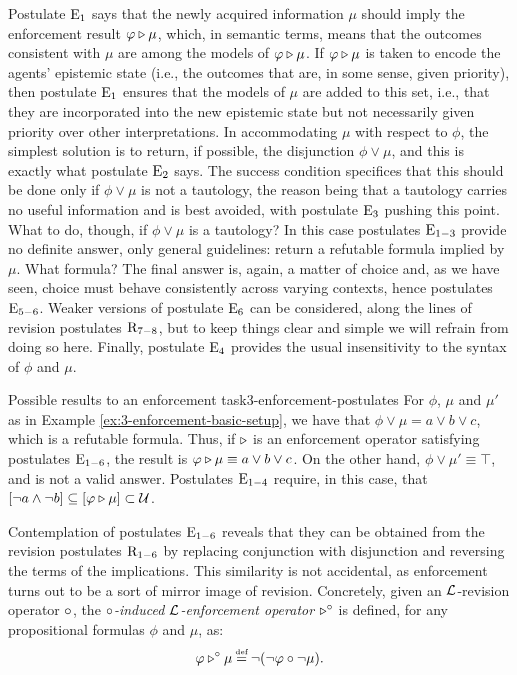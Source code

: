 Postulate $\mathrm{E}_{1}$ says that the newly acquired information $\mu$ 
should imply the enforcement result $\varphi\triangleright\mu$,
which, in semantic terms, means that the outcomes 
consistent with $\mu$ are among the models of $\varphi\triangleright\mu$.
If $\varphi\triangleright\mu$ is taken to encode the agents' epistemic state 
(i.e., the outcomes that are, in some sense, given priority), 
then postulate $\mathrm{E}_{1}$ ensures that the models of $\mu$ 
are added to this set,
i.e., that they are incorporated into the new epistemic state
but not necessarily given priority over other interpretations.
In accommodating $\mu$ with respect to $\phi$, 
the simplest solution is to return, if possible, 
the disjunction $\phi \lor \mu$, 
and this is exactly what postulate $\mathrm{E}_{2}$ says.
The success condition specifices that this 
should be done only if $\phi\lor\mu$ is not a tautology, 
the reason being that a tautology carries no useful information 
and is best avoided, with postulate $\mathrm{E}_{3}$ pushing this point.
What to do, though, if $\phi \lor \mu$ is a tautology? 
In this case postulates $\mathrm{E}_{1-3}$ provide no definite answer,
only general guidelines: return a refutable formula implied by $\mu$.
What formula? The final answer is, again, a matter of choice and, 
as we have seen, choice must behave consistently 
across varying contexts, hence postulates $\mathrm{E}_{5-6}$.
Weaker versions of postulate $\mathrm{E}_{6}$ can be considered,
along the lines of revision postulates $\mathrm{R}_{7-8}$, 
but to keep things clear and simple we will refrain from 
doing so here.
Finally, postulate $\mathrm{E}_{4}$ provides the usual 
insensitivity to the syntax of $\phi$ and $\mu$.

\begin{xmpl}{Possible results to an enforcement task}{3-enforcement-postulates}
	For $\phi$, $\mu$ and $\mu'$ as in Example \ref{ex:3-enforcement-basic-setup},
	we have that $\phi\lor\mu = a \lor b\lor c$, which is a refutable formula.
	Thus, if $\triangleright$ is an enforcement operator satisfying postulates $\mathrm{E}_{1-6}$,
	the result is $\varphi\triangleright\mu\equiv a\lor b\lor c$.
	On the other hand, $\phi\lor\mu'\equiv\top$, and is not a valid answer.
	Postulates $\mathrm{E}_{1-4}$ require, in this case, that $[\lnot a\land \lnot b]\subseteq[\varphi\triangleright\mu]\subset\mathcal{U}$. 
\end{xmpl}

Contemplation of postulates $\mathrm{E}_{1-6}$ reveals 
that they can be obtained from the revision postulates $\mathrm{R}_{1-6}$
by replacing conjunction with disjunction and reversing 
the terms of the implications. This similarity is not accidental,
as enforcement turns out to be a sort of mirror image of revision.
Concretely, given an $\mathcal{L}$-revision operator $\circ$, 
the \emph{$\circ$-induced $\mathcal{L}$-enforcement operator $\triangleright^\circ$} is defined, 
for any propositional formulas
$\phi$ and $\mu$, as:
\begin{equation}\label{eq:revision-to-enforcement}
	\phi\en^\re\mu \defeq \lnot(\lnot\phi\re\lnot\mu).	
\end{equation}

